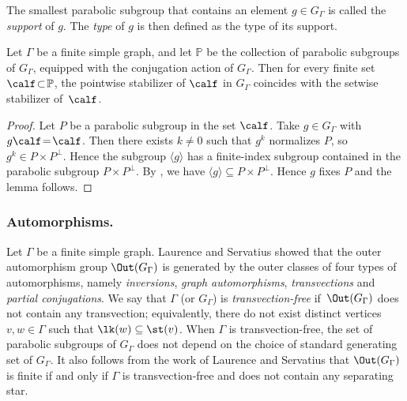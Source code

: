 The smallest parabolic subgroup that contains an element $g\in G_\Gamma$ is called the \emph{support} of $g$. The \emph{type} of $g$ is then defined as the type of its support.\enlargethispage{.9\baselineskip}%

\begin{lemma}
\label{lemma:setwise vs pointwise}
Let $\Gamma$ be a finite simple graph, and let $\mathbb P$ be the collection of parabolic subgroups of $G_\Gamma$, equipped with the conjugation action of $G_\Gamma$. Then for every finite set $\calf\! \subset\! \mathbb P$, the pointwise stabilizer of $\calf$ in $G_\Gamma$ coincides with the setwise stabilizer of~$\calf$.
\end{lemma}

\begin{proof}
Let $P$ be a parabolic subgroup in the set $\calf$. Take $g\!\in\! G_\Gamma$ with \hbox{$g\calf\!=\!\calf$}. Then there exists $k\!\neq\! 0$ such that $g^k$ normalizes $P$, so $g^k\!\in\! P\times P^\perp$. Hence the sub\-group $\langle g\rangle$ has a finite-index subgroup contained in the parabolic subgroup \hbox{$P\!\times\! P^\perp$}. By \cite[Lem.\,6.4]{minasyan2012hereditary}, we have $\langle g\rangle\subseteq P\times P^\perp$. Hence $g$ fixes $P$ and the lemma follows.
\end{proof}

\subsubsection*{Automorphisms.} Let $\Gamma$ be a finite simple graph. Laurence \cite{laurence1995generating} and Servatius \cite{Ser} showed that the outer automorphism group $\Out(G_\Gamma)$ is generated by the outer classes of four types of automorphisms, namely \emph{inversions}, \emph{graph automorphisms}, \emph{transvections} and \emph{partial conjugations}. We say that $\Gamma$ (or $G_\Gamma$) is \emph{transvection-free} if~$\Out(G_\Gamma)$ does not contain any transvection; equivalently, there do not exist distinct vertices $v,w\in\Gamma$ such that $\lk(w)\subseteq \st(v)$. When $\Gamma$ is transvection-free, the set of parabolic subgroups of $G_\Gamma$ does not depend on the choice of standard generating set of $G_\Gamma$. It also follows from the work of Laurence and Servatius that $\Out(G_\Gamma)$ is finite if and only if $\Gamma$ is transvection-free and does not contain any separating star.


